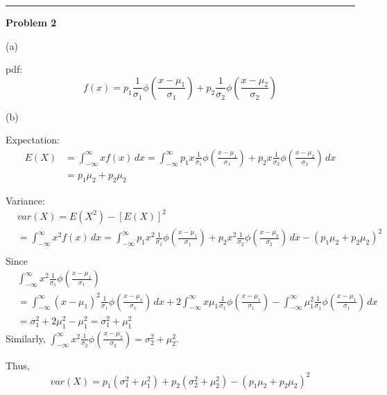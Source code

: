\documentclass[letterpaper, 11pt]{article}
\newcommand{\1}{\mathds{1}}	%
\theoremstyle{definition}
\begin{document}
\bigskip
\hrule
\bigskip


\textbf{Problem 2}

(a)

pdf:
\[
    f(x) = p_1 \frac{1}{\sigma_1} \phi (\frac{x - \mu_1}{\sigma_1}) + p_2 \frac{1}{\sigma_2} \phi (\frac{x - \mu_2}{\sigma_2})
\]

(b)

Expectation: \begin{align*}
    E(X) & = \int_{-\infty }^{\infty } xf(x) \, dx = \int_{-\infty }^{\infty } p_1 x\frac{1}{\sigma_1} \phi (\frac{x - \mu_1}{\sigma_1}) + p_2 x\frac{1}{\sigma_2} \phi (\frac{x - \mu_2}{\sigma_2})  \, dx \\
         & = p_1 \mu_2 + p_2 \mu_2
\end{align*}

Variance: \begin{align*}
     & var(X) = E(X^2) - [E(X)]^2                                                                                                                                                                                                              \\
     & =   \int_{-\infty }^{\infty } x^2f(x) \, dx = \int_{-\infty }^{\infty } p_1 x^2\frac{1}{\sigma_1} \phi (\frac{x - \mu_1}{\sigma_1}) + p_2 x^2\frac{1}{\sigma_2} \phi (\frac{x - \mu_2}{\sigma_2})  \, dx - ( p_1 \mu_2 + p_2 \mu_2)^{2} \\
\end{align*}
Since \begin{align*}
     & \int_{-\infty }^{\infty } x^2\frac{1}{\sigma_1} \phi (\frac{x - \mu_1}{\sigma_1})                                                                                                                                                                                                        \\
     & = \int_{-\infty }^{\infty } (x-\mu_1)^{2}\frac{1}{\sigma_1} \phi (\frac{x - \mu_1}{\sigma_1})\, dx + 2\int_{-\infty }^{\infty } x\mu_1\frac{1}{\sigma_1} \phi (\frac{x - \mu_1}{\sigma_1}) - \int_{-\infty }^{\infty } \mu_1^2 \frac{1}{\sigma_1} \phi (\frac{x - \mu_1}{\sigma_1})\, dx \\
     & = \sigma_1^2 + 2 \mu_1^{2} - \mu_1^2 = \sigma_1^2 + \mu_1^{2}
\end{align*}
Similarly, $\int_{-\infty }^{\infty } x^2\frac{1}{\sigma_2} \phi (\frac{x - \mu_2}{\sigma_2}) = \sigma_2^2 + \mu_2^2$.

Thus, \[
    var(X) = p_1(\sigma_1^2 + \mu_1 ^{2}) + p_2( \sigma_2^2 + \mu_2^2) - ( p_1 \mu_2 + p_2 \mu_2)^{2}
\]
\end{document}
